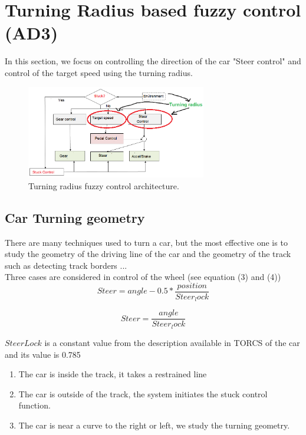\documentclass{llncs}
\begin{document}
\section{{\color{red}Turning Radius based fuzzy control (AD3) }}


In this section, we focus on controlling the direction of the car "Steer control" and control of the target speed using the turning radius.
\begin{figure}[h!]
	
	\centering
	\includegraphics[width=0.7\textwidth]{fig/steercible3.png}
	\begin{minipage}{10cm}
		\centering
		\caption{\footnotesize Turning radius fuzzy control architecture.}
		\label{fig45}
	\end{minipage} 
\end{figure}
\subsection{Car Turning geometry }	
There are many techniques used to turn a car, but the most effective one is to study the geometry of the driving line of the car and the geometry of the track such as detecting track borders ... \\

Three cases are considered in control of the wheel (see equation (3) and (4)) \\

\begin{equation}
Steer =  angle - 0.5 *\frac{position }{Steer_lock}		
\end{equation}

\begin{equation}
Steer =  \frac{angle }{Steer_lock}	
\end{equation}

$SteerLock $ is a constant value  from the description available in TORCS of the car  and its value is 0.785		
\begin{enumerate}
	\item  The car is inside the track, it takes a restrained line \\
	\item  The car is outside of the track, the system initiates the stuck control function.\\
	\item  The car is near a curve to the right or left, we study the turning geometry. \\	
\end{enumerate}	
\end{document}
